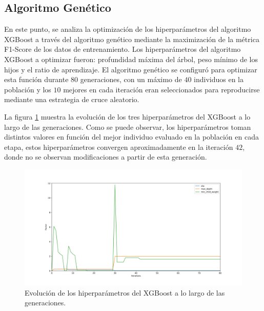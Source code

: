 \documentclass{uathesis-es}
\begin{document}
{\subsection*{Algoritmo Genético}



En este punto, se analiza la optimización de los hiperparámetros del algoritmo XGBoost a través del algoritmo genético mediante la maximización de la métrica F1-Score de los datos de entrenamiento. Los hiperparámetros del algoritmo XGBoost a optimizar fueron: profundidad máxima del árbol, peso mínimo de los hijos y el ratio de aprendizaje. El algoritmo genético se configuró para optimizar esta función durante $80$ generaciones, con un máximo de $40$ individuos en la población y los $10$ mejores en cada iteración eran seleccionados para reproducirse mediante una estrategia de cruce aleatorio.

La figura \ref{EvolucionHiperparametrosImage} muestra la evolución de  los tres hiperparámetros del XGBoost a lo largo de las generaciones. Como se puede observar, los hiperparámetros toman distintos valores en función del mejor individuo evaluado en la población en cada etapa, estos hiperparámetros convergen aproximadamente en la iteración $42$, donde no se observan modificaciones a partir de esta generación.

 \begin{figure}[H]
         \centering
         \includegraphics[width=14cm]{Figures/1stPaper/EvolutionH.png}
         \caption{Evolución de los hiperparámetros del XGBoost a lo largo de las generaciones.}
         \label{EvolucionHiperparametrosImage}
 \end{figure}

}
\end{document}
